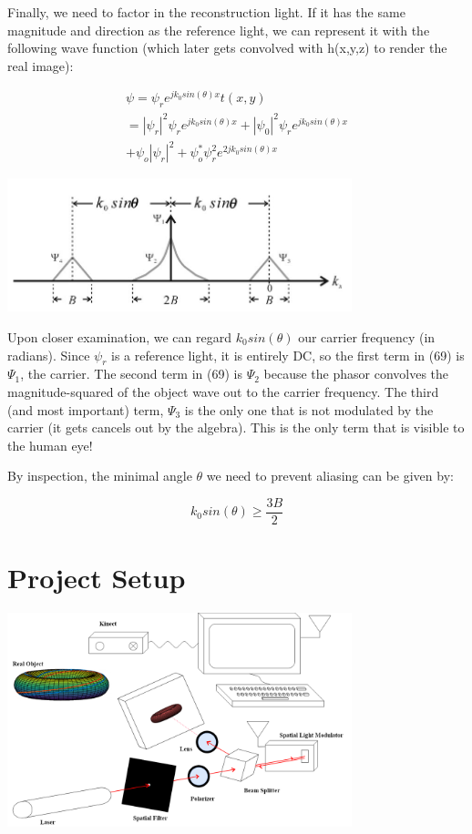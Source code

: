 \documentclass[12pt]{article}
\begin{document}
Finally, we need to factor in the reconstruction light. If it has the same magnitude and direction
as the reference light, we can represent it with the following wave function (which
later gets convolved with h(x,y,z) to render the real image):

\begin{equation}
	\begin{multlined}
	\psi = \psi_{r}e^{jk_{0}sin(\theta)x}t(x,y)
	\\=|\psi_{r}|^2\psi_{r}e^{jk_{0}sin(\theta)x} + |\psi_{0}|^2\psi_{r}e^{jk_{0}sin(\theta)x}
	\\+ \psi_{o}|\psi_{r}|^2 + \psi_{o}^*\psi_{r}^2e^{2jk_{0}sin(\theta)x}
	\end{multlined}
\end{equation}

\begin{center}
\includegraphics[width=100mm]{tupac14.png}
\end{center}

Upon closer examination, we can regard \(k_{0}sin(\theta)\) our carrier frequency (in radians). Since \(\psi_{r}\) is a reference light, it is entirely DC, so the first term
in (69) is \(\Psi_{1}\), the carrier.
The second term in (69) is \(\Psi_{2}\) because the phasor convolves the magnitude-squared of the object wave out to the carrier frequency.
The third (and most important) term, \(\Psi_{3}\) is the only one that is not modulated by the carrier (it gets cancels out by the algebra). 
This is the only term that is visible to the human eye!

By inspection, the minimal angle \(\theta\) we need to prevent aliasing can be given by:

\begin{equation}
	k_{0}sin(\theta) \geq \frac{3B}{2}
\end{equation}

\section{Project Setup}

\begin{center}
\includegraphics[width=100mm]{tupac10.png}
\end{center}
\end{document}
